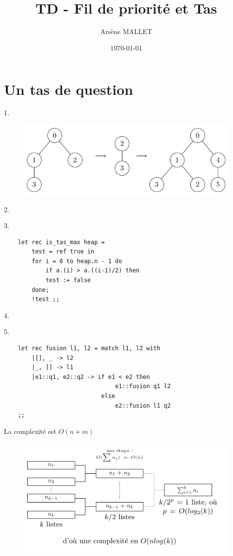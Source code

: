 \documentclass{article}
\title{TD - Fil de priorité et Tas}
\date{\today}
\author{Arsène MALLET}
\begin{document}
\thispagestyle{firstpage}

\begin{center}
    \huge{\@title}
\end{center}

\section{Un tas de question}

1.\begin{figure}[h]
    \centering
    \includegraphics[scale=0.7]{drawing/I_1.pdf}
\end{figure}

2. 

3. \begin{verbatim}
    let rec is_tas_max heap = 
        test = ref true in
        for i = 0 to heap.n - 1 do
            if a.(i) > a.((i-1)/2) then
            test := false
        done;
        !test ;;
\end{verbatim}

4.

5. \begin{verbatim}
    let rec fusion l1, l2 = match l1, l2 with
        |[], _ -> l2
        |_, [] -> l1
        |e1::q1, e2::q2 -> if e1 < e2 then
                                e1::fusion q1 l2
                            else
                                e2::fusion l1 q2 
    ;;
\end{verbatim}

La complexité est $O(n+m)$
\begin{figure}[h]
    \centering
    \includegraphics{drawing/I_5.pdf}
\end{figure}
\end{document}
